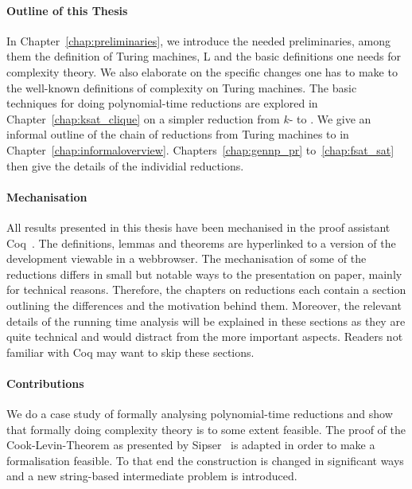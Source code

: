\paragraph{Outline of this Thesis}
In Chapter~\ref{chap:preliminaries}, we introduce the needed preliminaries, among them the definition of Turing machines, L and the basic definitions one needs for complexity theory. We also elaborate on the specific changes one has to make to the well-known definitions of complexity on Turing machines.
The basic techniques for doing polynomial-time reductions are explored in Chapter~\ref{chap:ksat_clique} on a simpler reduction from $k$-\SAT{} to \Clique{}.
We give an informal outline of the chain of reductions from Turing machines to \SAT{} in Chapter~\ref{chap:informaloverview}. 
Chapters~\ref{chap:gennp_pr} to~\ref{chap:fsat_sat} then give the details of the individial reductions.

\paragraph{Mechanisation}
All results presented in this thesis have been mechanised in the proof assistant Coq~\cite{coqweb}. The definitions, lemmas and theorems are hyperlinked to a version of the development viewable in a webbrowser.
The mechanisation of some of the reductions differs in small but notable ways to the presentation on paper, mainly for technical reasons. 
Therefore, the chapters on reductions each contain a section outlining the differences and the motivation behind them. 
Moreover, the relevant details of the running time analysis will be explained in these sections as they are quite technical and would distract from the more important aspects.
Readers not familiar with Coq may want to skip these sections.

\paragraph{Contributions}
We do a case study of formally analysing polynomial-time reductions and show that formally doing complexity theory is to some extent feasible.
The proof of the Cook-Levin-Theorem as presented by Sipser~\cite{Sipser:TheoryofComputation} is adapted in order to make a formalisation feasible. To that end the construction is changed in significant ways and a new string-based intermediate problem is introduced. 






